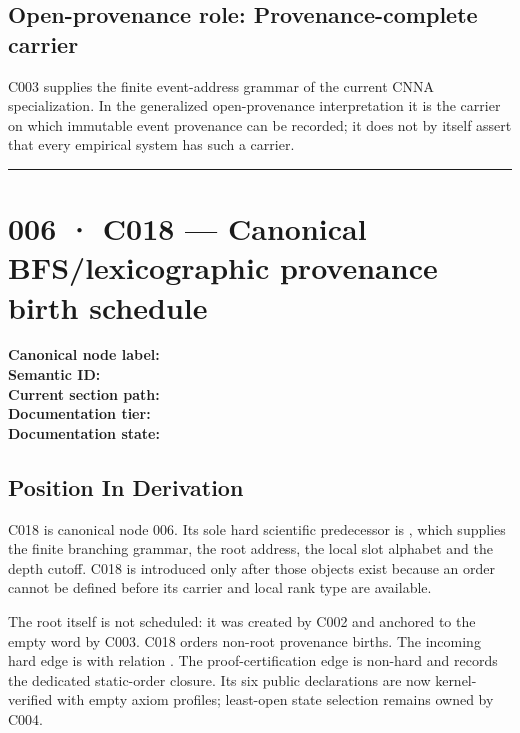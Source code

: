 \subsection{Open-provenance role: Provenance-complete
carrier}\label{open-provenance-role-provenance-complete-carrier}

C003 supplies the finite event-address grammar of the current CNNA
specialization. In the generalized open-provenance interpretation it is
the carrier on which immutable event provenance can be recorded; it does
not by itself assert that every empirical system has such a carrier.

\begin{center}\rule{0.5\linewidth}{0.5pt}\end{center}

\section{006 · C018 --- Canonical BFS/lexicographic provenance birth
schedule}\label{c018-canonical-bfslexicographic-provenance-birth-schedule}

\textbf{Canonical node label:} \texttt{\protect{}}\\
\textbf{Semantic ID:} \texttt{\protect{}}\\
\textbf{Current section path:} \texttt{\protect{}}\\
\textbf{Documentation tier:} \texttt{\protect{}}\\
\textbf{Documentation state:} \texttt{\protect{}}

\subsection{Position In Derivation}\label{position-in-derivation-2}

C018 is canonical node 006. Its sole hard scientific predecessor is
\texttt{\protect{}}, which supplies the finite branching grammar, the
root address, the local slot alphabet and the depth cutoff. C018 is
introduced only after those objects exist because an order cannot be
defined before its carrier and local rank type are available.

The root itself is not scheduled: it was created by C002 and anchored to
the empty word by C003. C018 orders non-root provenance births. The
incoming hard edge is \texttt{\protect{}} with
relation \texttt{\protect{}}. The
proof-certification edge \texttt{\protect{}} is
non-hard and records the dedicated static-order closure. Its six public
declarations are now kernel-verified with empty axiom profiles;
least-open state selection remains owned by C004.

